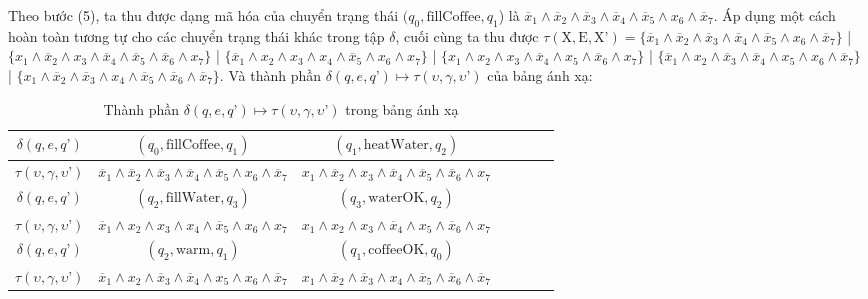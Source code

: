\documentclass[a4paper,13pt,oneside,openany]{book}
\begin{document}
\begin{flushleft}
	Theo bước (5), ta thu được dạng mã hóa của chuyển trạng thái $(q_0, \textrm{fillCoffee}, q_1$) là $\overline{x}_1 \land \overline{x}_2 \land \overline{x}_3 \land \overline{x}_4 \land \overline{x}_5 \land x_6 \land \overline{x}_7$. Áp dụng một cách hoàn toàn tương tự cho các chuyển trạng thái khác trong tập $\delta$, cuối cùng ta thu được $\tau(\textrm{X}, \textrm{E}, \textrm{X'}) = \{\overline{x}_1 \land \overline{x}_2 \land \overline{x}_3 \land \overline{x}_4 \land \overline{x}_5 \land x_6 \land \overline{x}_7 \}$ | $\{x_1 \land \overline{x}_2 \land x_3 \land \overline{x}_4 \land \overline{x}_5 \land \overline{x}_6 \land x_7 \}$ | $\{\overline{x}_1 \land x_2 \land x_3 \land x_4 \land \overline{x}_5 \land x_6 \land x_7\}$ | $\{x_1 \land x_2 \land x_3 \land \overline{x}_4 \land x_5 \land \overline{x}_6 \land x_7\}$ | $\{\overline{x}_1 \land x_2 \land \overline{x}_3 \land \overline{x}_4 \land x_5 \land x_6 \land \overline{x}_7\}$ | $\{x_1 \land \overline{x}_2 \land \overline{x}_3 \land x_4 \land \overline{x}_5 \land \overline{x}_6 \land \overline{x}_7\}$.
	Và thành phần $\delta(q, e, q\textrm{'}) \mapsto \tau(\upsilon, \gamma, \upsilon\textrm{'})$ của bảng ánh xạ:
	\begin{table}[!ht]
		\centering
		\renewcommand{\arraystretch}{1.25}
		\begin{tabular}{|c|c|c|c|c|c|c|}
			\hline
			$\delta(q, e, q\textrm{'})$ & $(q_0, \textrm{fillCoffee}, q_1)$ & $(q_1, \textrm{heatWater}, q_2)$\\
			\hline
			$\tau(\upsilon, \gamma, \upsilon\textrm{'})$ & $\overline{x}_1 \land \overline{x}_2 \land \overline{x}_3 \land \overline{x}_4 \land \overline{x}_5 \land x_6 \land \overline{x}_7$ & $x_1 \land \overline{x}_2 \land x_3 \land \overline{x}_4 \land \overline{x}_5 \land \overline{x}_6 \land x_7$ \\
			\hline
			$\delta(q, e, q\textrm{'})$ & $(q_2, \textrm{fillWater}, q_3) $ & $(q_3, \textrm{waterOK}, q_2)$\\
			\hline
			$\tau(\upsilon, \gamma, \upsilon\textrm{'})$ & $\overline{x}_1 \land x_2 \land x_3 \land x_4 \land \overline{x}_5 \land x_6 \land x_7$ & $x_1 \land x_2 \land x_3 \land \overline{x}_4 \land x_5 \land \overline{x}_6 \land x_7$\\
			\hline
			$\delta(q, e, q\textrm{'})$ & $(q_2, \textrm{warm}, q_1)$ & $(q_1, \textrm{coffeeOK}, q_0) $ \\
			\hline
			$\tau(\upsilon, \gamma, \upsilon\textrm{'})$ & $\overline{x}_1 \land x_2 \land \overline{x}_3 \land \overline{x}_4 \land x_5 \land x_6 \land \overline{x}_7$ & $x_1 \land \overline{x}_2 \land \overline{x}_3 \land x_4 \land \overline{x}_5 \land \overline{x}_6 \land \overline{x}_7 $\\
			\hline
		\end{tabular}
		\caption{Thành phần $\delta(q, e, q\textrm{'}) \mapsto \tau(\upsilon, \gamma, \upsilon\textrm{'})$ trong bảng ánh xạ}
	\end{table}
	

\end{flushleft}
\end{document}
